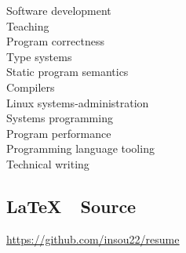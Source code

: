 \documentclass[a4paper]{deedy-resume}
\begin{document}
\begin{minipage}[t]{0.33\textwidth}
Software development \\
Teaching \\
Program correctness \\
Type systems \\
Static program semantics \\
Compilers \\
Linux systems-administration \\
Systems programming \\
Program performance \\
Programming language tooling \\
Technical writing

\vspace{5cm}
\subsection{\LaTeX \ \ Source}

\href{https://github.com/insou22/resume}
	{\underline{https://github.com/insou22/resume}}


\end{minipage}
\hfill
%
%
\end{document}
